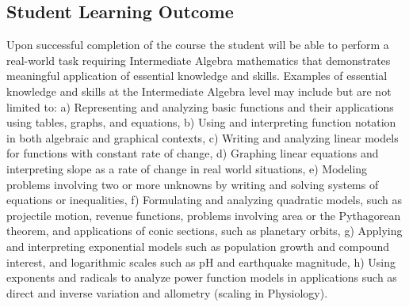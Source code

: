 \documentclass[12pt, twoside]{article}
\begin{document}
\subsection*{Student Learning Outcome}
   Upon successful completion of the course the student will be able to perform a real-world task requiring Intermediate Algebra mathematics that demonstrates meaningful application of essential knowledge and skills.  Examples of essential knowledge and skills at the Intermediate Algebra level may include but are not limited to: a) Representing and analyzing basic functions and their applications using tables, graphs, and equations, b) Using and interpreting function notation in both algebraic and graphical contexts, c) Writing and analyzing linear models for functions with constant rate of change, d) Graphing linear equations and interpreting slope as a rate of change in real world situations, e) Modeling problems involving two or more unknowns by writing and solving systems of equations or inequalities, f) Formulating and analyzing quadratic models, such as projectile motion, revenue functions, problems involving area or the Pythagorean theorem, and applications of conic sections, such as planetary orbits, g) Applying and interpreting exponential models such as population growth and compound interest, and logarithmic scales such as pH and earthquake magnitude, h) Using exponents and radicals to analyze power function models in applications such as direct and inverse variation and allometry (scaling in Physiology).



\end{document}
